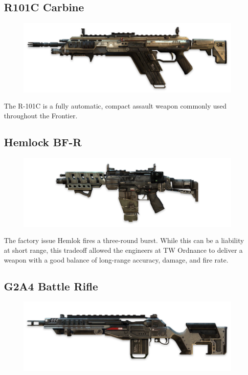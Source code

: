 \documentclass[9pt, openany]{extbook}
\begin{document}
\subsection{R101C Carbine}
\begin{figure}
\vspace*{-2em}
\includegraphics[width=\linewidth]{R101CCarbine}
\end{figure}


The R-101C is a fully automatic, compact assault weapon commonly used throughout the Frontier. 


\subsection{Hemlock BF-R}
\begin{figure}
\vspace*{-2em}
\includegraphics[width=\linewidth]{HemlokBFR}
\end{figure}
The factory issue Hemlok fires a three-round burst. While this can be a liability at short range, this tradeoff allowed the engineers at TW Ordnance to deliver a weapon with a good balance of long-range accuracy, damage, and fire rate.

\subsection{G2A4 Battle Rifle}
\begin{figure}
\vspace*{-2em}
\includegraphics[width=\linewidth]{G2A4Rifle}
\end{figure}
\end{document}
